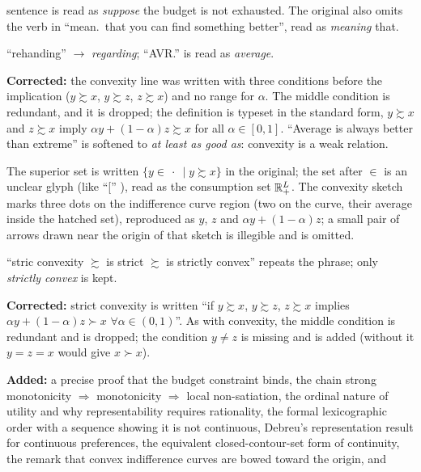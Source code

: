 \documentclass[11pt]{article}
\begin{document}
\begin{transcriptnotes}
        sentence is read as \emph{suppose} the budget is not exhausted. The
        original also omits the verb in ``mean.\ that you can find something
        better'', read as \emph{meaning} that.
  \item ``rehanding'' $\to$ \emph{regarding}; ``AVR.'' is read as \emph{average}.
  \item \textbf{Corrected:} the convexity line was written with three conditions
        before the implication ($y\succsim x$, $y\succsim z$, $z\succsim x$) and no
        range for $\alpha$. The middle condition is redundant, and it is dropped;
        the definition is typeset in the standard form, $y\succsim x$ and
        $z\succsim x$ imply $\alpha y+(1-\alpha)z\succsim x$ for all
        $\alpha\in[0,1]$. ``Average is always better than extreme'' is softened to
        \emph{at least as good as}: convexity is a weak relation.
  \item The superior set is written $\{y\in\ \cdot\ \mid y\succsim x\}$ in the
        original; the set after $\in$ is an unclear glyph (like ``['' ), read as
        the consumption set $\mathbb{R}^L_+$. The convexity sketch marks three dots on
        the indifference curve region (two on the curve, their average inside the
        hatched set), reproduced as $y$, $z$ and $\alpha y+(1-\alpha)z$; a small
        pair of arrows drawn near the origin of that sketch is illegible and is
        omitted.
  \item ``stric convexity $\succsim$ is strict $\succsim$ is strictly convex''
        repeats the phrase; only \emph{strictly convex} is kept.
  \item \textbf{Corrected:} strict convexity is written ``if $y\succsim x$,
        $y\succsim z$, $z\succsim x$ implies $\alpha y+(1-\alpha)z\succ x$
        $\forall\alpha\in(0,1)$''. As with convexity, the middle condition is
        redundant and is dropped; the condition $y\ne z$ is missing and is added
        (without it $y=z=x$ would give $x\succ x$).
  \item \textbf{Added:} a precise proof that the budget constraint binds, the
        chain strong monotonicity $\Rightarrow$ monotonicity $\Rightarrow$ local
        non-satiation, the ordinal nature of utility and why representability
        requires rationality, the formal lexicographic order with a sequence showing
        it is not continuous, Debreu's representation result for continuous
        preferences, the equivalent closed-contour-set form of continuity, the
        remark that convex indifference curves are bowed toward the origin, and

\end{transcriptnotes}
\end{document}
